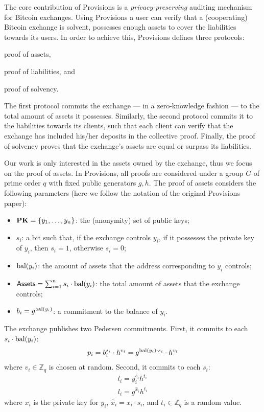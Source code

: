 The core contribution of Provisions is a \emph{privacy-preserving} auditing
mechanism for Bitcoin exchanges. Using Provisions a user can verify that a
(cooperating) Bitcoin exchange is solvent, \ie possesses enough assets to cover
the liabilities towards its users. In order to achieve this, Provisions defines
three protocols:
\begin{inparaenum}[i)]
    \item proof of assets,
    \item proof of liabilities, and
    \item proof of solvency.
\end{inparaenum}
The first protocol commits the exchange --- in a zero-knowledge fashion --- to
the total amount of assets it possesses. Similarly, the second protocol commits
it to the liabilities towards its clients, such that each client can verify
that the exchange has included his/her deposits in the collective proof.
Finally, the proof of solvency proves that the exchange's assets are equal or
surpass its liabilities.

Our work is only interested in the assets owned by the exchange, thus we focus
on the proof of assets. In Provisions, all proofs are considered under a group
$G$ of prime order $q$ with fixed public generators $g, h$. The proof of assets
considers the following parameters (here we follow the notation of the original
Provisions paper):
\begin{itemize}
    \item $\text{\textbf{PK}} = \{y_1, \dots, y_n \}$: the (anonymity) set of public keys;
    \item $s_i$: a bit such that, if the exchange controls $y_i$, \ie if it possesses the private key of $y_i$, then $s_i = 1$, otherwise $s_i = 0$;
    \item $\text{bal}(y_i)$: the amount of assets that the address corresponding to $y_i$ controls;
    \item $\mathsf{Assets} = \sum_{i = 1}^n s_i \cdot \text{bal}(y_i)$: the total amount of assets that the exchange controls;
    \item $b_i = g^{\text{bal}(y_i)}$: a commitment to the balance of $y_i$.
\end{itemize}

The exchange publishes two Pedersen commitments. First, it commits to each $s_i
\cdot \text{bal}(y_i)$:
\begin{align}
    p_i = b_i^{s_i} \cdot h^{v_i} = g^{\text{bal}(y_i) \cdot s_i} \cdot h^{v_i} \label{eq:balance-commit}
\end{align}
where $v_i \in \mathbb{Z}_q$ is chosen at random.
Second, it commits to each $s_i$:
\begin{align}
    l_i = y_i^{s_i}h^{t_i} \label{eq:ownership-commit} \\
    l_i = g^{\hat{x}_i}h^{t_i} \label{eq:privkey-commit}
\end{align}
where $x_i$ is the private key for $y_i$, $\hat{x}_i = x_i \cdot s_i$, and $t_i
\in \mathbb{Z}_q$ is a random value.

